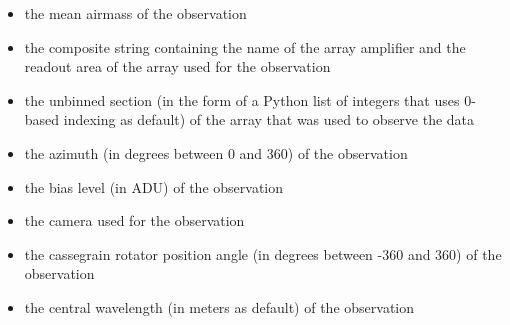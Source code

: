 \documentclass[letterpaper,10pt,english]{sphinxmanual}
\begin{document}
\begin{itemize}
\item {} 
the mean airmass of the observation

\end{itemize}

\begin{itemize}
\item {} 
the composite string containing the name of the array amplifier and the
readout area of the array used for the observation

\end{itemize}

\begin{itemize}
\item {} 
the unbinned section (in the form of a Python list of integers that uses
0-based indexing as default) of the array that was used to observe the data

\end{itemize}

\begin{itemize}
\item {} 
the azimuth (in degrees between 0 and 360) of the observation

\end{itemize}

\begin{itemize}
\item {} 
the bias level (in ADU) of the observation

\end{itemize}

\begin{itemize}
\item {} 
the camera used for the observation

\end{itemize}

\begin{itemize}
\item {} 
the cassegrain rotator position angle (in degrees between -360 and 360) of
the observation

\end{itemize}

\begin{itemize}
\item {} 
the central wavelength (in meters as default) of the observation

\end{itemize}
\end{document}
